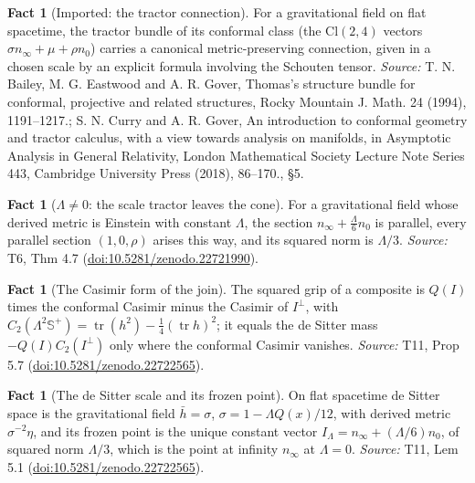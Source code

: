 \documentclass[11pt]{article}
\theoremstyle{definition}
\newtheorem{fact}[theorem]{Fact}
\theoremstyle{plain}
\providecommand{\CS}{}\renewcommand{\CS}{{\mathbb{S}^{+}}}
\providecommand{\Cl}{}\renewcommand{\Cl}{\mathrm{Cl}}
\providecommand{\hb}{}\renewcommand{\hb}{\bar{h}}
\providecommand{\nInf}{}\renewcommand{\nInf}{n_\infty}
\providecommand{\nO}{}\renewcommand{\nO}{n_0}
\providecommand{\tr}{}\renewcommand{\tr}{\operatorname{tr}}
\begin{document}
\begin{fact}[Imported: the tractor connection]\label{c:interior.imported-tractor-connection}
For a gravitational field on flat spacetime, the tractor bundle of its conformal class (the $\Cl(2,4)$ vectors $\sigma\nInf + \mu + \rho\nO$) carries a canonical metric-preserving connection, given in a chosen scale by an explicit formula involving the Schouten tensor.
\emph{Source:} T. N. Bailey, M. G. Eastwood and A. R. Gover, Thomas's structure bundle for conformal, projective and related structures, Rocky Mountain J. Math. 24 (1994), 1191--1217.; S. N. Curry and A. R. Gover, An introduction to conformal geometry and tractor calculus, with a view towards analysis on manifolds, in Asymptotic Analysis in General Relativity, London Mathematical Society Lecture Note Series 443, Cambridge University Press (2018), 86--170., \S 5.
\end{fact}

\begin{fact}[$\Lambda \neq 0$: the scale tractor leaves the cone]\label{c:interior.scale-tractor-leaves-cone}
For a gravitational field whose derived metric is Einstein with constant $\Lambda$, the section $\nInf + \tfrac{\Lambda}{6}\nO$ is parallel, every parallel section $(1, 0, \rho)$ arises this way, and its squared norm is $\Lambda/3$.
\emph{Source:} T6, Thm 4.7 (\href{https://doi.org/10.5281/zenodo.22721990}{doi:10.5281/zenodo.22721990}).
\end{fact}

\begin{fact}[The Casimir form of the join]\label{c:mass.casimir-form-join}
The squared grip of a composite is $Q(I)$ times the conformal Casimir minus the Casimir of $I^{\perp}$, with $C_{2}(\Lambda^{2}\CS) = \tr(h^{2}) - \tfrac14(\tr h)^{2}$; it equals the de Sitter mass $-Q(I)C_{2}(I^{\perp})$ only where the conformal Casimir vanishes.
\emph{Source:} T11, Prop 5.7 (\href{https://doi.org/10.5281/zenodo.22722565}{doi:10.5281/zenodo.22722565}).
\end{fact}

\begin{fact}[The de Sitter scale and its frozen point]\label{c:mass.de-sitter-scale-frozen-point}
On flat spacetime de Sitter space is the gravitational field $\hb = \sigma$, $\sigma = 1 - \Lambda Q(x)/12$, with derived metric $\sigma^{-2}\eta$, and its frozen point is the unique constant vector $I_\Lambda = n_\infty + (\Lambda/6)n_0$, of squared norm $\Lambda/3$, which is the point at infinity $n_\infty$ at $\Lambda = 0$.
\emph{Source:} T11, Lem 5.1 (\href{https://doi.org/10.5281/zenodo.22722565}{doi:10.5281/zenodo.22722565}).
\end{fact}
\end{document}
